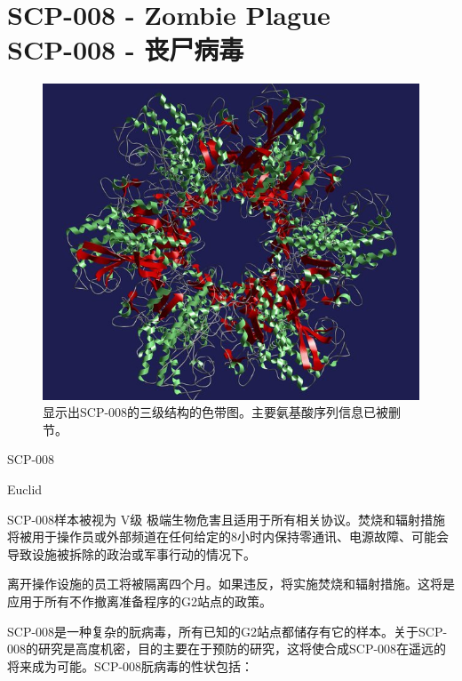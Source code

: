 \chapter[SCP-008 丧尸病毒]{
	SCP-008 - Zombie Plague\\
	SCP-008 - 丧尸病毒
}

\label{chap:SCP-008}

\begin{scpbox}




\end{scpbox}


\begin{figure}[H]
	\centering
	\includegraphics[width=0.5\linewidth]{images/SCP.008.jpg}
	\caption*{显示出SCP-008的三级结构的色带图。主要氨基酸序列信息已被删节。}
\end{figure}

SCP-008

Euclid

SCP-008样本被视为 V级 极端生物危害且适用于所有相关协议。焚烧和辐射措施将被用于操作员或外部频道在任何给定的8小时内保持零通讯、电源故障、可能会导致设施被拆除的政治或军事行动的情况下。

离开操作设施的员工将被隔离四个月。如果违反，将实施焚烧和辐射措施。这将是应用于所有不作撤离准备程序的G2站点的政策。

SCP-008是一种复杂的朊病毒，所有已知的G2站点都储存有它的样本。关于SCP-008的研究是高度机密，目的主要在于预防的研究，这将使合成SCP-008在遥远的将来成为可能。SCP-008朊病毒的性状包括：

